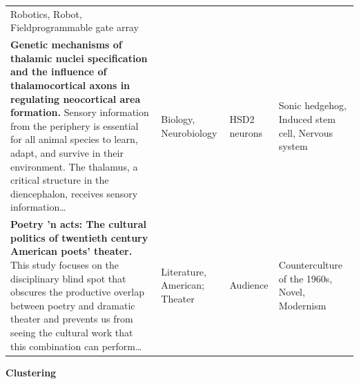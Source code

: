 \documentclass[]{krantz}
\begin{document}
\begin{longtable}[]{@{}llll@{}}
\begin{minipage}[t]{0.09\columnwidth}
Robotics, Robot, Fieldprogrammable gate array\strut
\end{minipage}\tabularnewline
\begin{minipage}[t]{0.64\columnwidth}\raggedright\strut
\textbf{Genetic mechanisms of thalamic nuclei specification and the
influence of thalamocortical axons in regulating neocortical area
formation.} Sensory information from the periphery is essential for all
animal species to learn, adapt, and survive in their environment. The
thalamus, a critical structure in the diencephalon, receives sensory
information\ldots{}\strut
\end{minipage} & \begin{minipage}[t]{0.12\columnwidth}\raggedright\strut
Biology, Neurobiology\strut
\end{minipage} & \begin{minipage}[t]{0.03\columnwidth}\raggedright\strut
HSD2 neurons\strut
\end{minipage} & \begin{minipage}[t]{0.09\columnwidth}\raggedright\strut
Sonic hedgehog, Induced stem cell, Nervous system\strut
\end{minipage}\tabularnewline
\begin{minipage}[t]{0.64\columnwidth}\raggedright\strut
\textbf{Poetry 'n acts: The cultural politics of twentieth century
American poets' theater.} This study focuses on the disciplinary blind
spot that obscures the productive overlap between poetry and dramatic
theater and prevents us from seeing the cultural work that this
combination can perform\ldots{}\strut
\end{minipage} & \begin{minipage}[t]{0.12\columnwidth}\raggedright\strut
Literature, American; Theater\strut
\end{minipage} & \begin{minipage}[t]{0.03\columnwidth}\raggedright\strut
Audience\strut
\end{minipage} & \begin{minipage}[t]{0.09\columnwidth}\raggedright\strut
Counterculture of the 1960s, Novel, Modernism\strut
\end{minipage}\tabularnewline
\bottomrule
\end{longtable}

\textbf{Clustering}
\end{document}
